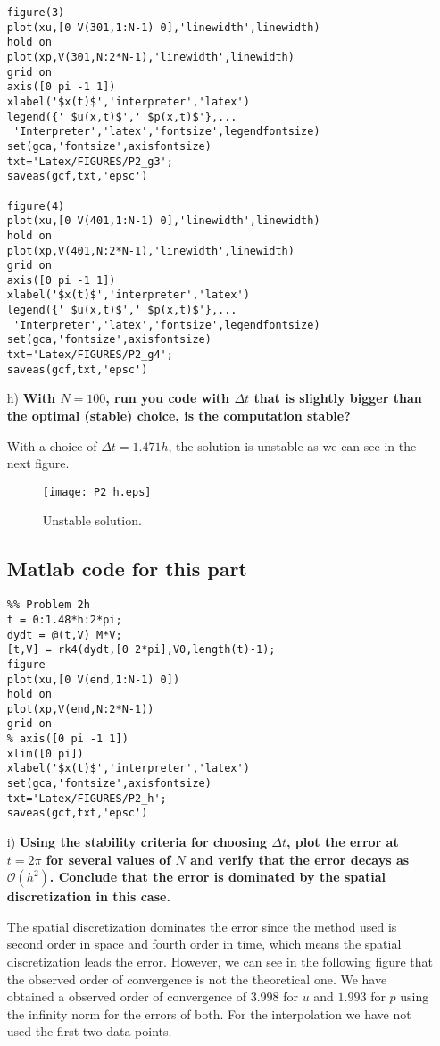 \begin{enumerate}
\begin{verbatim}
figure(3)
plot(xu,[0 V(301,1:N-1) 0],'linewidth',linewidth)
hold on
plot(xp,V(301,N:2*N-1),'linewidth',linewidth)
grid on
axis([0 pi -1 1])
xlabel('$x(t)$','interpreter','latex')
legend({' $u(x,t)$',' $p(x,t)$'},...
 'Interpreter','latex','fontsize',legendfontsize)
set(gca,'fontsize',axisfontsize)
txt='Latex/FIGURES/P2_g3';
saveas(gcf,txt,'epsc')

figure(4)
plot(xu,[0 V(401,1:N-1) 0],'linewidth',linewidth)
hold on
plot(xp,V(401,N:2*N-1),'linewidth',linewidth)
grid on
axis([0 pi -1 1])
xlabel('$x(t)$','interpreter','latex')
legend({' $u(x,t)$',' $p(x,t)$'},...
 'Interpreter','latex','fontsize',legendfontsize)
set(gca,'fontsize',axisfontsize)
txt='Latex/FIGURES/P2_g4';
saveas(gcf,txt,'epsc')
\end{verbatim}

\item[h)] \textbf{With $N=100$, run you code with $\Delta t$ that is slightly bigger than the optimal (stable) choice, is the computation stable?}

With a choice of $\Delta t=1.471 h$, the solution is unstable as we can see in the next figure.

\begin{figure}[H]
\centering     %
{\texttt{[image: P2\_h.eps]}}
\caption{Unstable solution.}
\end{figure}

\subsection*{Matlab code for this part}
\begin{verbatim}
%% Problem 2h
t = 0:1.48*h:2*pi;
dydt = @(t,V) M*V;
[t,V] = rk4(dydt,[0 2*pi],V0,length(t)-1);
figure 
plot(xu,[0 V(end,1:N-1) 0])
hold on
plot(xp,V(end,N:2*N-1))
grid on
% axis([0 pi -1 1])
xlim([0 pi])
xlabel('$x(t)$','interpreter','latex')
set(gca,'fontsize',axisfontsize)
txt='Latex/FIGURES/P2_h';
saveas(gcf,txt,'epsc')
\end{verbatim}

\item[i)] \textbf{Using the stability criteria for choosing $\Delta t$, plot the error at $t = 2\pi$ for several values of $N$ and verify that the error decays as $\mathcal{O}(h^2)$. Conclude that the error is dominated by the spatial discretization in this case.}

The spatial discretization dominates the error since the method used is second order in space and fourth order in time, which means the spatial discretization leads the error. However, we can see in the following figure that the observed order of convergence is not the theoretical one. We have obtained a observed order of convergence of $3.998$ for $u$ and $1.993$ for $p$ using the infinity norm for the errors of both. For the interpolation we have not used the first two data points.


\end{enumerate}
